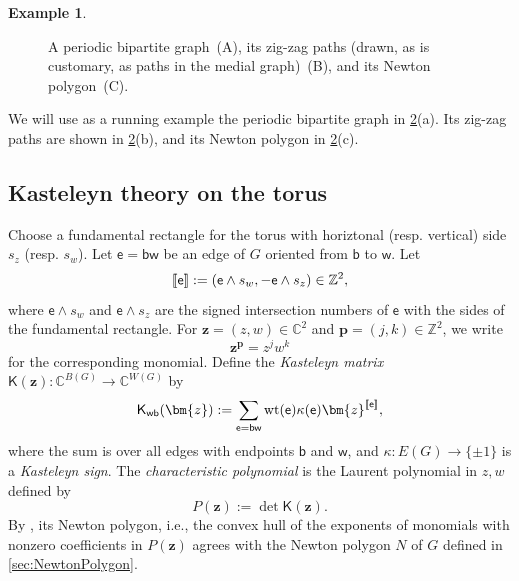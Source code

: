 \documentclass[12pt]{amsart}
\numberwithin{equation}{section}
\theoremstyle{definition}
\newtheorem{example}[theorem]{Example}
\newcommand{\Z}{\mathbb{Z}}
\newcommand{\C}{\mathbb{C}}
\def\Gtor{G}
\def\blackvertices{B}
\def\whitevertices{W}
\def\edges{E}
\newcommand{\wt}{\mathrm{wt}}
\def\bw{\mathsf{w}}
\def\bb{\mathsf{b}}
\def\be{{\mathsf{e}}}
\def\bK{\mathsf{K}}
\def\pt{{\bm{p}}} %
\def\ptC{{\bm{z}}} %
\def\det{\operatorname{det}}
\def\hom[#1]{[\mkern-3mu[#1]\mkern-3mu]}
\begin{document}
\begin{example}
\begin{figure}
\begin{subfigure}[c]{0.20\textwidth}

\caption{}
\label{fig:genus-one-newton}
\end{subfigure}

\caption{
A periodic bipartite graph~(A), its zig-zag paths (drawn, as is customary, as paths in the medial graph)~(B), and its Newton polygon~(C).
}\label{fig:running-example-zigzags-genus-one}
\end{figure}


We will use as a running example the periodic bipartite graph in
\cref{fig:running-example-zigzags-genus-one}(a).
Its zig-zag paths are shown in
\cref{fig:running-example-zigzags-genus-one}(b), and its Newton polygon in \cref{fig:running-example-zigzags-genus-one}(c).
\end{example}







\subsection{Kasteleyn theory on the torus}


Choose a fundamental rectangle for the torus with horiztonal (resp. vertical) side $s_z$ (resp. $s_w$). Let $\be=\bb\bw$ be an edge of $\Gtor$ oriented from $\bb$ to $\bw$. Let
\[
 \hom[\be] := (\be \wedge s_w,-\be\wedge s_z)\in\Z^2, 
\]
where $\be \wedge s_w$ and $\be\wedge s_z$ are the signed intersection numbers of $\be$ with the  sides of the fundamental rectangle. For $\ptC = (z,w) \in \C^2$ and $\pt = (j,k) \in \Z^2$, we write 
\[
\ptC^{\pt} = z^j w^k
\]
for the corresponding monomial. Define the \emph{Kasteleyn matrix} $\bK(\ptC): \C^{\blackvertices(G)} \to 
\C^{\whitevertices(G)}$ by 
\[
\bK_{\bw \bb}(\ptC) :=
\sum_{\be=\bb\bw} \wt(\be)\kappa(\be)
\ptC^{\hom[\be]},
\]
where the sum is over all edges with endpoints $\bb$ and $\bw$, and $\kappa:\edges(\Gtor) \to \{\pm 1\}$ is a \emph{Kasteleyn sign}. The \emph{characteristic polynomial} is the Laurent polynomial in $z,w$ defined by
\[
P(\ptC) := \det \bK(\ptC).
\]
By {\cite[Theorem~3.12]{GK}}, its Newton polygon, i.e., the convex hull of the exponents of monomials with nonzero coefficients in $P(\ptC)$ agrees with the Newton polygon $N$ of $G$ defined in \cref{sec:NewtonPolygon}. 
\end{document}
